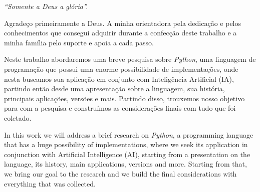 \begin{flushright}
{\it ``Somente a Deus a glória''.}
\end{flushright}


\pagebreak



\vspace{1.5cm}

Agradeço primeiramente a Deus. A minha orientadora pela dedicação e pelos conhecimentos que consegui adquirir durante a confecção deste trabalho e a minha família pelo suporte e apoia a cada passo.

\vspace{0.5cm}

\newpage


\vspace{1.5cm}

Neste trabalho abordaremos uma breve pesquisa sobre \textit{Python}, uma linguagem de programação que possui uma enorme possibilidade de implementações, onde nesta buscamos sua aplicação em conjunto com Inteligência Artificial (IA), partindo então desde uma apresentação sobre a linguagem, sua história, principais aplicações, versões e mais. Partindo disso, trouxemos nosso objetivo para com a pesquisa e construímos as considerações finais com tudo que foi coletado.

\vspace{0.5cm}


\pagebreak

\thispagestyle{empty}


\vspace{1.5cm}

In this work we will address a brief research on \textit{Python}, a programming language that has a huge possibility of implementations, where we seek its application in conjunction with Artificial Intelligence (AI), starting from a presentation on the language, its history, main applications, versions and more. Starting from that, we bring our goal to the research and we build the final considerations with everything that was collected.

\vspace{0.5cm}


